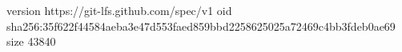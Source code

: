 version https://git-lfs.github.com/spec/v1
oid sha256:35f622f44584aeba3e47d553faed859bbd2258625025a72469c4bb3fdeb0ae69
size 43840
